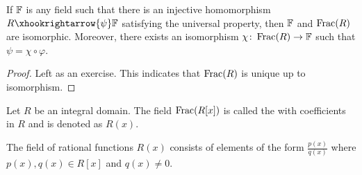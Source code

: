 \begin{cor}
    If $\mathbb{F}$ is any field such that there is an injective homomorphism $R \xhookrightarrow{\psi} \F$ satisfying the universal property, then $\mathbb{F}$ and $\operatorname{Frac}(R)$ are isomorphic. Moreover, there exists an isomorphism $\chi \colon \operatorname{Frac}(R) \to \mathbb{F}$ such that $\psi = \chi\circ\varphi$.
\end{cor}
\begin{proof}
    Left as an exercise. This indicates that $\operatorname{Frac}(R)$ is unique up to isomorphism. 
\end{proof}

\begin{defn}
    Let $R$ be an integral domain. The field $\operatorname{Frac}(R[x])$ is called the  with coefficients in $R$ and is denoted as $R(x)$.
\end{defn}

The field of rational functions $R(x)$ consists of elements of the form $\frac{p(x)}{q(x)}$ where $p(x), q(x) \in R[x]$ and $q(x) \neq 0$.
